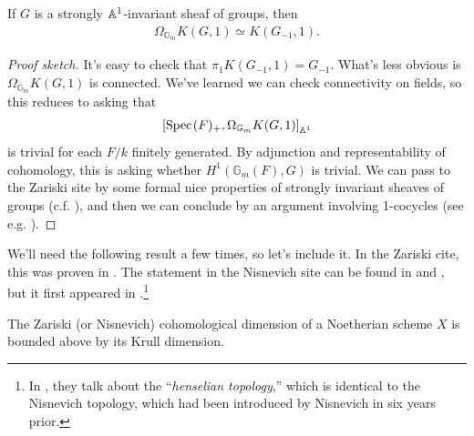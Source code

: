\documentclass[11pt,openany]{book}
\begin{document}
\begin{lemma}\label{lem:loops-KG1} 
If $G$ is a strongly $\mathbb{A}^1$-invariant sheaf of groups, then
\begin{align*}
    \Omega_{\mathbb{G}_m} K(G,1) \simeq K(G_{-1},1).
\end{align*}
\end{lemma}
\begin{proof}[Proof sketch] It's easy to check that $\pi_1 K(G_{-1},1) = G_{-1}$. What's less obvious is $\Omega_{\mathbb{G}_m} K(G,1)$ is connected. We've learned we can check connectivity on fields, so this reduces to asking that
\begin{align*}
    \left[ \text{Spec}\hspace{0.1em}(F)_+, \Omega_{\mathbb{G}_m} K(G,1) \right]_{\mathbb{A}^1}
\end{align*}
is trivial for each $F/k$ finitely generated. By adjunction and representability of cohomology, this is asking whether $H^1(\mathbb{G}_m(F), G)$ is trivial. We can pass to the Zariski site by some formal nice properties of strongly invariant sheaves of groups (c.f. \cite[2.24]{Morel}), and then we can conclude by an argument involving 1-cocycles (see e.g. \cite[4.2]{bachmannstrongly}).
\end{proof}

We'll need the following result a few times, so let's include it. In the Zariski cite, this was proven in \cite[3.6.5]{Tohoku}. The statement in the Nisnevich site can be found in \cite[E.6(c)]{TT} and \cite[1.32]{Nisnevich-cd}, but it first appeared in \cite[1.2.5]{KS-Global}.\footnote{In \cite{KS-Global}, they talk about the ``\textit{henselian topology},'' which is identical to the Nisnevich topology, which had been introduced by Nisnevich in \cite{Nis80} six years prior.}

\begin{theorem}\label{thm:cd-krull-dim-inequality}
The Zariski (or Nisnevich) cohomological dimension of a Noetherian scheme $X$ is bounded above by its Krull dimension.
\end{theorem}
\end{document}
